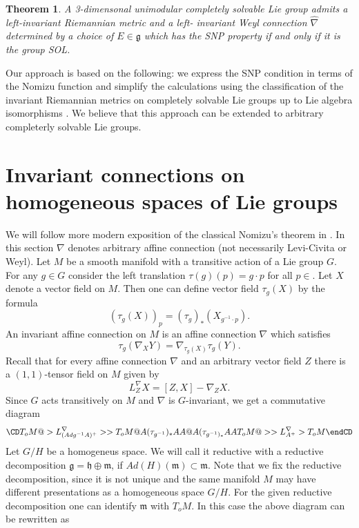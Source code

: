 \documentclass[12pt]{article}
\newtheorem{theorem}{Theorem}
\begin{document}
\begin{theorem}\label{thm:main} A 3-dimensonal unimodular completely solvable Lie group admits  a left-invariant Riemannian metric and a left- invariant Weyl connection $\widehat{\nabla}$ determined by a choice of $E\in\mathfrak{g}$ which has the SNP property if and only if it is the group SOL.
\end{theorem}
Our approach is based on the following:  we express the SNP condition in terms of the Nomizu function and simplify the calculations using the classification of the invariant Riemannian metrics on completely solvable Lie groups up to Lie algebra isomorphisms \cite{KHL}.  We believe that this approach can be extended to  arbitrary completerly solvable Lie groups.   
  
\section{Invariant connections on homogeneous spaces of Lie groups}
We will follow more modern exposition of the classical Nomizu's theorem in \cite{DGP}. In this section $\nabla$ denotes arbitrary affine connection (not necessarily Levi-Civita or Weyl). Let $M$ be a smooth manifold with a transitive action of a Lie group $G$. For any $g\in G$ consider the left translation $\tau(g)(p)=g\cdot p$ for all $p\in $. Let $X$ denote a vector field on $M$. Then one can define vector field $\tau_g(X)$ by the formula 
$$(\tau_{g}(X))_p=(\tau_g)_*(X_{g^{-1}\cdot p}).$$
An invariant affine connection on $M$ is an affine connection $\nabla$ which satisfies 
$$\tau_g(\nabla_XY)=\nabla_{\tau_g(X)}\tau_g(Y).$$
Recall that for every affine connection $\nabla$ and an arbitrary vector field $Z$ there is a $(1,1)$-tensor field on $M$ given by
$$L_Z^{\nabla}X=[Z,X]-\nabla_ZX.$$
Since $G$ acts transitively on $M$ and $\nabla$ is $G$-invariant, we get a commutative diagram
$$
\CD
T_oM @>{L^{\nabla}_{(Ad g^{-1}A)^+}}>> T_oM\\
@A{ (\tau_{g^{-1}})_*}AA  @A{(\tau_{g^{-1})_*}}AA\\
T_oM @>>{L^{\nabla}_{A^+}}> T_oM
\endCD
$$
Let $G/H$ be a homogeneus space. We will call it reductive with a reductive decomposition $\mathfrak{g}=\mathfrak{h}\oplus\mathfrak{m}$, if $Ad(H)(\mathfrak{m})\subset\mathfrak{m}$. Note that we fix the reductive decomposition, since it is not unique and the same manifold $M$ may have different presentations as a homogeneous space $G/H$.  For the given reductive decomposition one can identify $\mathfrak{m}$ with $T_oM$. In this case  the above diagram can be rewritten as 
\end{document}
